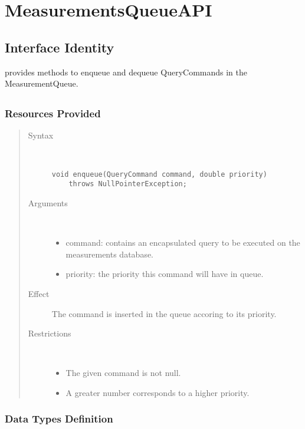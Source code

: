 \section{MeasurementsQueueAPI}

\subsection{Interface Identity}

\npar {} provides methods to enqueue and dequeue
QueryCommands in the MeasurementQueue.

\subsection{}

\subsubsection{Resources Provided}

\begin{quote}
	\begin{description}
		\item[Syntax] \ 
		\begin{verbatim}
void enqueue(QueryCommand command, double priority) 
    throws NullPointerException;
		\end{verbatim}
		\item[Arguments] \
		\begin{itemize}
			\item command: contains an encapsulated query to be executed on the
			measurements database.
			\item priority: the priority this command will have in queue. 
		\end{itemize}
		\item[Effect] The command is inserted in the queue accoring to its priority.
		\item[Restrictions] \ 
		\begin{itemize}
			\item The given command is not null.
			\item A greater number corresponds to a higher priority. 
		\end{itemize}
	\end{description} 
\end{quote}

\subsubsection{Data Types Definition}

